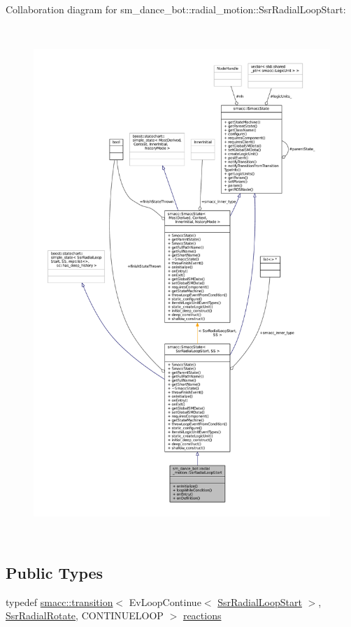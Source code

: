 Collaboration diagram for sm\+\_\+dance\+\_\+bot\+:\+:radial\+\_\+motion\+:\+:Ssr\+Radial\+Loop\+Start\+:
\nopagebreak
\begin{figure}[H]
\begin{center}
\leavevmode
\includegraphics[height=550pt]{structsm__dance__bot_1_1radial__motion_1_1SsrRadialLoopStart__coll__graph}
\end{center}
\end{figure}
\subsection*{Public Types}
\begin{DoxyCompactItemize}
\item 
typedef \hyperlink{classsmacc_1_1transition}{smacc\+::transition}$<$ Ev\+Loop\+Continue$<$ \hyperlink{structsm__dance__bot_1_1radial__motion_1_1SsrRadialLoopStart}{Ssr\+Radial\+Loop\+Start} $>$, \hyperlink{structsm__dance__bot_1_1radial__motion_1_1SsrRadialRotate}{Ssr\+Radial\+Rotate}, C\+O\+N\+T\+I\+N\+U\+E\+L\+O\+OP $>$ \hyperlink{structsm__dance__bot_1_1radial__motion_1_1SsrRadialLoopStart_a25bb17bde5e8df7b3ec1df98ab4eda08}{reactions}
\end{DoxyCompactItemize}
